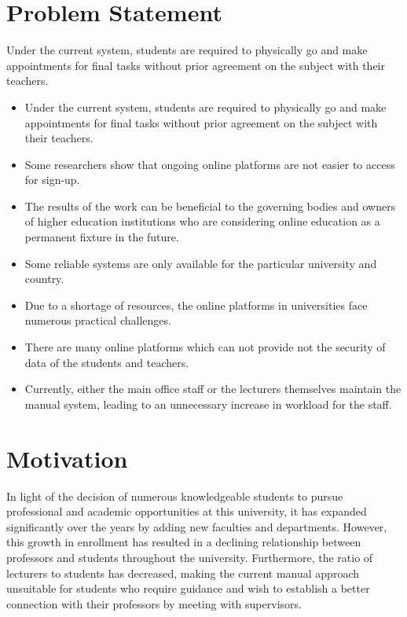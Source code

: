 \section{Problem Statement}
Under the current system, students are required to physically go and make appointments for final tasks without prior agreement on the subject with their teachers.
\begin{itemize}
    \item Under the current system, students are required to physically go and make appointments for final tasks without prior agreement on the subject with their teachers.

    
    \item Some researchers show that ongoing online platforms are not easier to access for sign-up.
    
    \item The results of the work can be beneficial to the governing bodies and owners of higher education institutions who are considering online education as a permanent fixture in the future.

    \item Some reliable systems are only available for the particular university and country.

    
    \item	Due to a shortage of resources, the online platforms in universities face numerous practical challenges.
    
    \item	There are many online platforms which can not provide not the security of data of the students and teachers. 

    
    \item Currently, either the main office staff or the lecturers themselves maintain the manual system, leading to an unnecessary increase in workload for the staff.

\end{itemize}


\section{Motivation}
In light of the decision of numerous knowledgeable students to pursue professional and academic opportunities at this university, it has expanded significantly over the years by adding new faculties and departments. However, this growth in enrollment has resulted in a declining relationship between professors and students throughout the university. Furthermore, the ratio of lecturers to students has decreased, making the current manual approach unsuitable for students who require guidance and wish to establish a better connection with their professors by meeting with supervisors.\\




